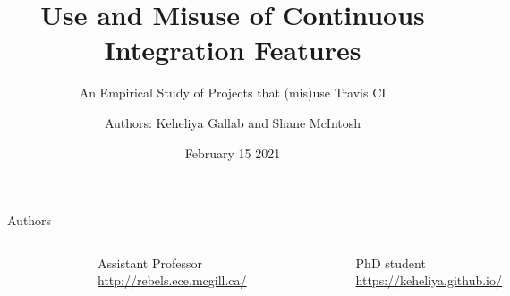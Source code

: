 \documentclass[aspectratio=169,xcolor=dvipsnames]{beamer}
\title[short title]{Use and Misuse of Continuous Integration Features}
\subtitle{An Empirical Study of Projects that (mis)use Travis CI}
\author[Pin-Yen] {Authors: Keheliya Gallab and Shane McIntosh }
\institute[NTU] %
{   Philip Mottershead
    \vskip 3pt
}
\date{February 15 2021} %
\begin{document}
\begin{frame}
    \titlepage
\end{frame}
\begin{frame}{Authors}
    \begin{columns}[c] %
        \begin{figure}
            \centering
            \includegraphics[width=0.5\textwidth]{images/shane.jpg}
            \label{fig:my_label}
        \end{figure}
        \linebreak
        \centering Assistant Professor \linebreak    
        \centering\url{http://rebels.ece.mcgill.ca/}

       \begin{figure}
           \centering
           \includegraphics[width=0.5\textwidth]{images/keheliya.jpg}
           \label{fig:my_label}
       \end{figure}
       \linebreak
       \centering PhD student \linebreak
       \centering \url{https://keheliya.github.io/}

    \end{columns}
\end{frame}
\end{document}
